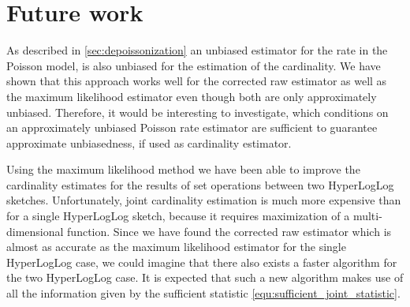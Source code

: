 \documentclass[a4paper]{scrartcl}
\newcommand{\numformat}[1]{{\num[scientific-notation = true,round-mode = places,round-precision = 3, output-exponent-marker = \ensuremath{\mathrm{e}}]{#1}}}
\newcommand{\numformattwo}[1]{{\num[scientific-notation = fixed,round-mode = places,round-precision = 3]{#1}}}
\begin{document}

\section{Future work}
As described in \cref{sec:depoissonization} an unbiased estimator for the rate in the Poisson model, is also unbiased for the estimation of the cardinality. We have shown that this approach works well for the corrected raw estimator as well as the maximum likelihood estimator even though both are only approximately unbiased. Therefore, it would be interesting to investigate, which conditions on an approximately unbiased Poisson rate estimator are sufficient to guarantee approximate unbiasedness, if used as cardinality estimator.

Using the maximum likelihood method we have been able to improve the cardinality estimates for the results of set operations between two HyperLogLog sketches. Unfortunately, joint cardinality estimation is much more expensive than for a single HyperLogLog sketch, because it requires maximization of a multi-dimensional function. Since we have found the corrected raw estimator which is almost as accurate as the maximum likelihood estimator for the single HyperLogLog case, we could imagine that there also exists a faster algorithm for the two HyperLogLog case. It is expected that such a new algorithm makes use of all the information given by the sufficient statistic \eqref{equ:sufficient_joint_statistic}.
\end{document}
